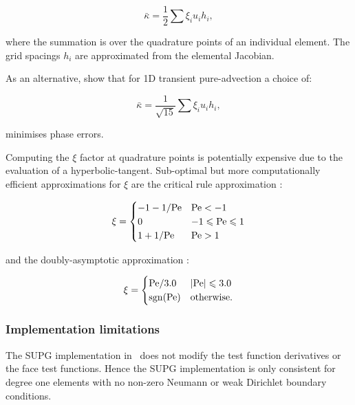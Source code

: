 \begin{equation}\label{eqn:md_nu_bar}
  \bar{\kappa} = \frac{1}{2} \sum{\xi_i u_i h_i},
\end{equation}

where the summation is over the quadrature points of an individual element. The
grid spacings $h_i$ are approximated from the elemental Jacobian.

As an alternative, \citet{raymond1976} show that for
1D transient pure-advection a choice of:

\begin{equation}\label{eqn:md_nu_bar_transient}
  \bar{\kappa} = \frac{1}{\sqrt{15}} \sum{\xi_i u_i h_i},
\end{equation}

minimises phase errors.

Computing the $\xi$ factor at quadrature points is potentially expensive due to
the evaluation of a hyperbolic-tangent. Sub-optimal but more computationally
efficient approximations for $\xi$ are the critical rule approximation \citep{brooks1982}:

\begin{equation}
  \xi = \begin{cases}
          -1 - 1 / \mathrm{Pe}  & \mathrm{Pe} < -1 \\
          0             & -1 \leqslant \mathrm{Pe} \leqslant 1 \\
          1 + 1 / \mathrm{Pe}   & \mathrm{Pe} > 1
        \end{cases}
\end{equation}

and the doubly-asymptotic approximation \citep{DoneaBook}:

\begin{equation}
  \xi = \begin{cases}
          \mathrm{Pe} / 3.0  & \left| \mathrm{Pe} \right| \leqslant 3.0 \\
          \operatorname{sgn}(\mathrm{Pe})  & \textrm{otherwise}.
        \end{cases}
\end{equation}

\subsubsection{Implementation limitations}

The SUPG implementation in \fluidity\ does not modify the test function derivatives
or the face test functions. Hence the SUPG implementation is only consistent
for degree one elements with no non-zero Neumann or weak Dirichlet boundary
conditions.

